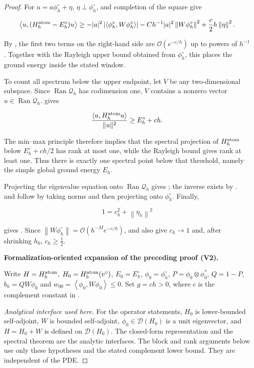 \documentclass[11pt]{article}
\newcommand{\formalisationparentid}{X}
\newenvironment{formalisationaddition}[1]{\par\medskip\begingroup\color{blue}\def\formalisationparentid{#1}\setcounter{formalizationsublemma}{0}\let\lemma\formalizationsublemma\let\endlemma\endformalizationsublemma
  \def\Eo{\mathcal E_h^\circ}\def\EE{\mathcal E_h}\def\phio{\phi_h^\circ}\def\phih{\phi_h}\def\Ho{H_h^{\rm atom}(v^\circ)}\def\Ha{H_h^{\rm atom}}\def\HL{H_h^{L}}\def\Dh{D_h}\def\Log{\operatorname{Log}}\def\ellh{\ell_h}\def\Gp{G_{p,h}}\def\Ast{A_{*,h}}\def\ahat{\widehat{\mathfrak a}_h}\def\ah{\mathfrak a_h}\def\rh{\widehat\rho_h}\def\deltah{\widehat\delta_h}\def\oldref##1{\textup{(##1)}}\def\interface##1{\par\noindent\textit{Analytical interface used here.} ##1\par}\def\finish{\par\noindent\textit{Conclusion of the formalization-oriented expansion.} }\par\noindent\textbf{Formalization-oriented expansion of the preceding proof (V2).}\par\smallskip
}{\par\endgroup\medskip
}
\newcommand{\cQ}{\mathcal Q}
\newcommand{\cO}{\mathcal O}
\newcommand{\abs}[1]{\left|#1\right|}
\newcommand{\norm}[1]{\left\|#1\right\|}
\newcommand{\ip}[2]{\left\langle #1,#2\right\rangle}
\newcommand{\Ran}{\operatorname{Ran}}
\begin{document}
\begin{proof}
For $u=a\phi_h^\circ+\eta$, $\eta\perp\phi_h^\circ$,  and completion of the square give

$$
 \ip{u}{(H_h^{\rm atom}-E_h^\circ)u}
 \ge -|a|^2\abs{\ip{\phi_h^\circ}{W\phi_h^\circ}}
 -Ch^{-1}|a|^2\norm{W\phi_h^\circ}^2
 +\frac c2h\norm{\eta}^2.
$$

By , the first two terms on the right-hand side are $\cO(e^{-c/h})$ up to powers of $h^{-1}$. Together with the Rayleigh upper bound obtained from $\phi_h^\circ$, this places the ground energy inside the stated window.

To count all spectrum below the upper endpoint, let $V$ be any two-dimensional subspace. Since $\Ran\cQ_h$ has codimension one, $V$ contains a nonzero vector $u\in\Ran\cQ_h$.  gives

$$
 \frac{\ip{u}{H_h^{\rm atom}u}}{\|u\|^2}\ge E_h^\circ+ch.
$$

The min--max principle therefore implies that the spectral projection of $H_h^{\rm atom}$ below $E_h^\circ+ch/2$ has rank at most one, while the Rayleigh bound gives rank at least one. Thus there is exactly one spectral point below that threshold, namely the simple global ground energy $E_h$.

Projecting the eigenvalue equation onto $\Ran\cQ_h$ gives ; the inverse exists by .  and  follow by taking norms and then projecting onto $\phi_h^\circ$. Finally,

$$
 1=c_h^2+\norm{\eta_h}^2
$$

gives . Since $\norm{W\phi_h^\circ}=\cO(h^{-M}e^{-c/h})$,  and  also give $c_h\to1$ and, after shrinking $h_0$, $c_h\ge\tfrac12$.

\begin{formalisationaddition}{P3.2}
Write $H=\Ha$, $H_0=\Ho$, $E_0=E_h^\circ$, $\phi_0=\phio$,
$P=\phi_0\otimes\phi_0^*$, $Q=1-P$, $b_h=QW\phi_0$ and
$w_{00}=\ip{\phi_0}{W\phi_0}\le0$.
Set $g=ch>0$, where $c$ is the complement constant in
.

\interface{For the operator statements, $H_0$ is lower-bounded
self-adjoint, $W$ is bounded self-adjoint, $\phi_0\in\mathcal D(H_0)$
is a unit eigenvector, and $H=H_0+W$ is defined on $\mathcal D(H_0)$.
The closed-form representation and the spectral theorem are the analytic
interfaces. The block and rank arguments below use only these hypotheses
and the stated complement lower bound. They are independent of the PDE.}


\end{formalisationaddition}
\end{proof}
\end{document}
